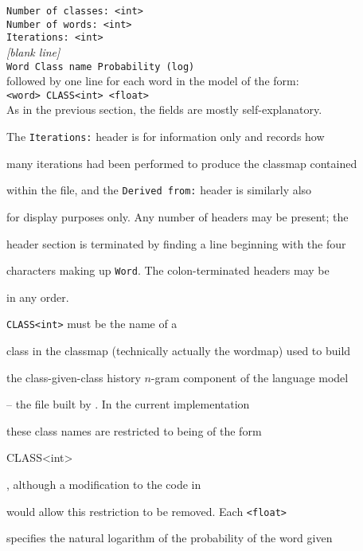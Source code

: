 \texttt{Number of classes: <int>}\\


\texttt{Number of words: <int>}\\


\texttt{Iterations: <int>}\\


\textit{[blank line]}\\


\texttt{Word    Class name   Probability (log)}\\


followed by one line for each word in the model of the form:\\


\texttt{<word> CLASS<int> <float>}\\





As in the previous section, the fields are mostly self-explanatory.


The {\tt Iterations:} header is for information only and records how


many iterations had been performed to produce the classmap contained


within the file, and the {\tt Derived from:} header is similarly also


for display purposes only.  Any number of headers may be present; the


header section is terminated by finding a line beginning with the four


characters making up {\tt Word}. The colon-terminated headers may be


in any order.





{\tt CLASS<int>} must be the name of a


class in the classmap (technically actually the wordmap) used to build


the class-given-class history $n$-gram component of the language model


-- the file built by .  In the current implementation


these class names are restricted to being of the form {\tt


CLASS<int>}, although a modification to the code in 


would allow this restriction to be removed.  Each {\tt <float>}


specifies the natural logarithm of the probability of the word given


